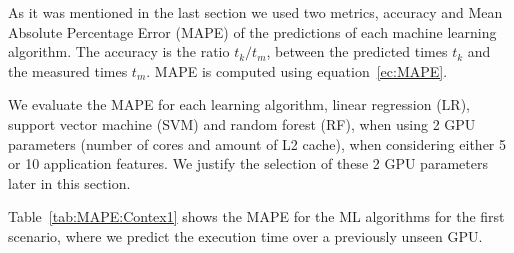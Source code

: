 As it was mentioned in the last section we used two metrics, accuracy and Mean Absolute Percentage Error (MAPE) of the predictions of each machine learning algorithm. The accuracy is the ratio $t_k/t_m$, between the predicted times $t_k$ and the measured times $t_m$. MAPE is computed using equation~\ref{ec:MAPE}.

We evaluate the MAPE for each learning algorithm, linear regression (LR), support vector machine (SVM) and random forest (RF), when using 2 GPU parameters (number of cores and amount of L2 cache), when considering either 5 or 10 application features. We justify the selection of these 2 GPU parameters later in this section.

Table~\ref{tab:MAPE:Contex1} shows the MAPE for the ML algorithms for the first scenario, where we predict the execution time over a previously unseen GPU. %



\begin{table}[htpb]
\centering
{}
\caption{MAPE of the prediction of the first context (in \%). }
\label{tab:MAPE:Contex1} 
\end{table}

